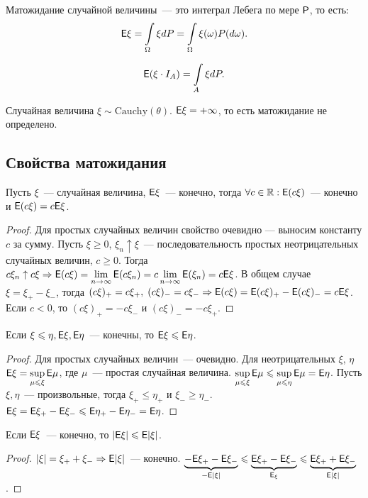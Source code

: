 Матожидание случайной величины~--- это интеграл Лебега по мере $\P$, то есть: $$ \E\xi = \int\limits_\Omega \xi dP = \int\limits_\Omega \xi(\omega)P(d\omega). $$

$$ \E(\xi\cdot I_A) = \int\limits_A \xi dP. $$

Случайная величина $\xi \sim \text{Cauchy}(\theta)$. $\E\xi = +\infty$, то есть матожидание не определено.

\subsection{Свойства матожидания}
\begin{property}
	Пусть $\xi$~--- случайная величина, $\E \xi$~--- конечно, тогда $\forall c \in \R : \E(c\xi)$~--- конечно и $\E(c\xi) = c\E\xi$.
	\begin{proof}
		Для простых случайных величин свойство очевидно --- выносим константу $c$ за сумму. Пусть $\xi \geqslant 0$, $\xi_n \uparrow \xi$~--- последовательность простых неотрицательных случайных величин, $c \geqslant 0$. Тогда $c\xi_n \uparrow c\xi \Rightarrow \E(c\xi) = \lim\limits_{n \rightarrow \infty} \E(c\xi_n) = c \lim\limits_{n \rightarrow \infty} \E(\xi_n) = c\E\xi$. В общем случае $\xi = \xi_+ - \xi_-$, тогда $(c\xi)_+ = c\xi_+,\; (c\xi)_- = c\xi_- \Rightarrow \E(c\xi) = \E(c\xi)_+ - \E(c\xi)_- = c\E\xi$. Если $c < 0$, то $(c\xi)_+ = -c\xi_-$ и $(c\xi)_- = -c\xi_+$.
	\end{proof}
\end{property}

\begin{property}
	Если $\xi \leqslant \eta, \E \xi, \E \eta$~--- конечны, то $\E \xi \leqslant \E \eta$.
	\begin{proof}
		Для простых случайных величин~--- очевидно. Для неотрицательных $\xi$, $\eta$ $\E\xi = \sup\limits_{\mu \leqslant \xi}\E\mu$, где $\mu$~--- простая случайная величина. $\sup\limits_{\mu \leqslant \xi}\E\mu \leqslant \sup\limits_{\mu \leqslant \eta}\E\mu = \E\eta$. Пусть $\xi, \eta$~--- произвольные, тогда $\xi_+ \leqslant \eta_+$ и $\xi_- \geqslant \eta_-$. $\E\xi = \E\xi_+ - \E\xi_- \leqslant \E\eta_+ - \E\eta_- = \E\eta$.
	\end{proof}
\end{property}
\begin{property}
	Если $\E\xi$~--- конечно, то $|\E\xi| \leqslant \E|\xi|$.
	\begin{proof}
		$|\xi| = \xi_+ + \xi_- \Rightarrow \E|\xi|$~--- конечно. $\underbrace{-\E\xi_+ - \E\xi_-}_{-\E|\xi|} \leqslant \underbrace{\E\xi_+ - \E\xi_-}_{\E_\xi} \leqslant \underbrace{\E\xi_+ + \E\xi_-}_{\E|\xi|}$.
	\end{proof}
\end{property}

